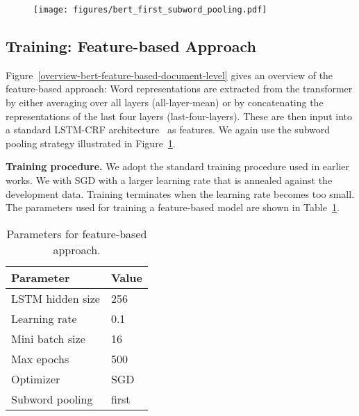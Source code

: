 \begin{figure}[t!]
 \centering
 \texttt{[image: figures/bert\_first\_subword\_pooling.pdf]}
 \label{fig:subword_pooling}
\end{figure}

\subsection{Training: Feature-based Approach}

Figure~\ref{overview-bert-feature-based-document-level} gives an overview of the feature-based approach: Word representations are extracted from the transformer by either averaging over all layers (all-layer-mean) or by concatenating the representations of the last four layers (last-four-layers). These are then input into a standard LSTM-CRF architecture~\cite{2015arXiv150801991H} as features. We again use the subword pooling strategy illustrated in Figure~\ref{fig:subword_pooling}. 

\noindent 
\textbf{Training procedure.} We adopt the standard training procedure used in earlier works. We with SGD with a larger learning rate that is annealed against the development data. Training terminates when the learning rate becomes too small. 
The parameters used for training a feature-based model are shown in Table~\ref{ner-training-parameters-feature-based}. 

\begin{table}[h!]
\begin{center}
\begin{tabular}{ l l }
\toprule
Parameter & Value \\
\midrule
LSTM hidden size & 256 \\
Learning rate & 0.1 \\
Mini batch size & 16 \\
Max epochs & 500 \\
Optimizer & SGD \\
Subword pooling & first \\
\bottomrule
\end{tabular}
\end{center}
\caption{\label{ner-training-parameters-feature-based} Parameters for feature-based approach.}
\end{table}


